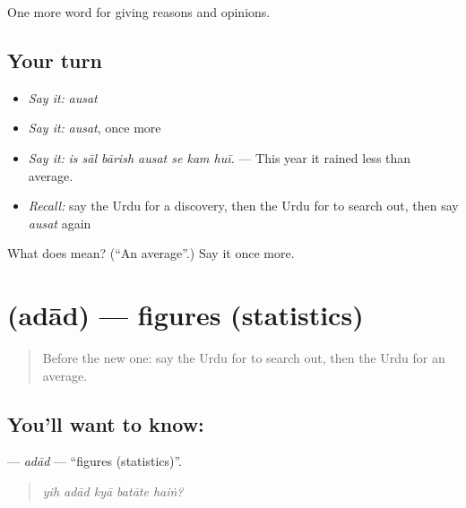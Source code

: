 \begin{grammarlens}[title={What you've built}]
One more word for giving reasons and opinions.
\end{grammarlens}

\subsection*{Your turn}
\begin{itemize}
\raggedright
  \item \emph{Say it:} \emph{ausat}
  \item \emph{Say it:} \emph{ausat}, once more
  \item \emph{Say it:} \emph{is sāl bārish ausat se kam huī.} — This year it rained less than average.
  \item \emph{Recall:} say the Urdu for a discovery, then the Urdu for to search out, then say \emph{ausat} again
\end{itemize}

\begin{tcolorbox}[breakable,colback=teal!4,colframe=teal!35!black,title={Before you move on}]
What does  mean? (\textquotedblleft{}An average\textquotedblright{}.) Say it once more.
\end{tcolorbox}
\section[\texorpdfstring{\ur{اعداد} (adād)}{اعداد (adād)}]{ (adād) — figures (statistics)}

\label{lesson:UR-C350-adad}



\begin{quote}
Before the new one: say the Urdu for to search out, then the Urdu for an average.
\end{quote}

\subsection*{You'll want to know: }
\textbf{} — \emph{adād} — \textquotedblleft{}figures (statistics)\textquotedblright{}.

\begin{quote}
    
\end{quote}

\begin{quote}
\emph{yih adād kyā batāte haiṅ?}
\end{quote}

